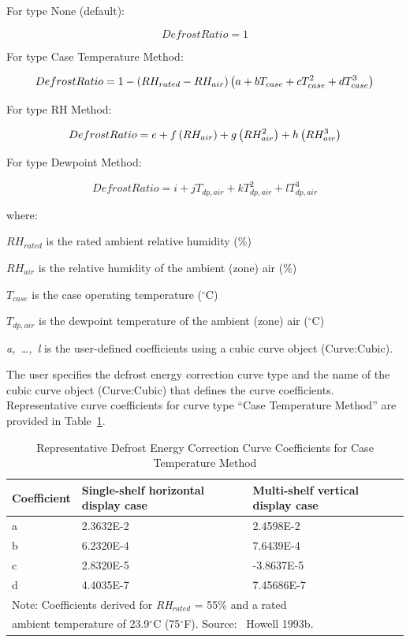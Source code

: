 For type None (default):

\begin{equation}
  DefrostRatio = 1
\end{equation}

For type Case Temperature Method:

\begin{equation}
  DefrostRatio = 1 - \left(RH_{rated} - RH_{air}\right) \left(a + b T_{case} + c T_{case}^2 + d T_{case}^3\right)
\end{equation}

For type RH Method:

\begin{equation}
  DefrostRatio = e + f \left(RH_{air}\right) + g \left(RH_{air}^2\right) + h \left(RH_{air}^3\right)
\end{equation}

For type Dewpoint Method:

\begin{equation}
  DefrostRatio = i + j T_{dp,air} + k T_{dp,air}^2 + l T_{dp,air}^3
\end{equation}

where:

\(R{H_{rated}}\) is the rated ambient relative humidity (\%)

\(R{H_{air}}\) is the relative humidity of the ambient (zone) air (\%)

\({T_{case}}\) is the case operating temperature (\(^{\circ}\)C)

\({T_{dp,air}}\) is the dewpoint temperature of the ambient (zone) air (\(^{\circ}\)C)

\emph{a,~\ldots{},~l} is the user-defined coefficients using a cubic curve object (Curve:Cubic).

The user specifies the defrost energy correction curve type and the name of the cubic curve object (Curve:Cubic) that defines the curve coefficients. Representative curve coefficients for curve type ``Case Temperature Method'' are provided in Table~\ref{table:representative-defrost-energy-correction}.

\begin{longtable}[c]{p{1.5in}p{2.36in}p{2.13in}}
\caption{Representative Defrost Energy Correction Curve Coefficients for Case Temperature Method \label{table:representative-defrost-energy-correction}} \tabularnewline
\toprule
Coefficient & Single-shelf horizontal display case & Multi-shelf vertical display case \tabularnewline
\midrule
\endhead

a & 2.3632E-2 & 2.4598E-2 \tabularnewline
b & 6.2320E-4 & 7.6439E-4 \tabularnewline
c & 2.8320E-5 & -3.8637E-5 \tabularnewline
d & 4.4035E-7 & 7.45686E-7 \tabularnewline
\midrule
\multicolumn{3}{l}{Note: Coefficients derived for \emph{RH\(_{rated}\)} = 55\% and a rated} \tabularnewline
\multicolumn{3}{l}{ambient temperature of 23.9\(^{\circ}\)C (75\(^{\circ}\)F). Source:~ Howell 1993b.} \tabularnewline
\bottomrule
\end{longtable}

